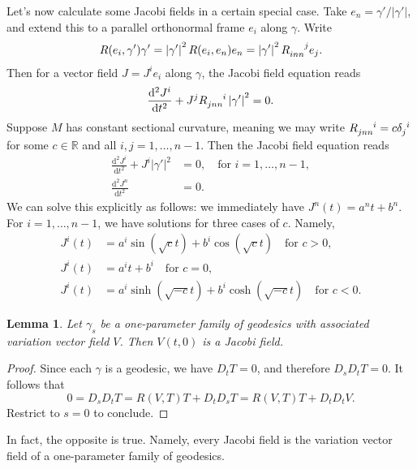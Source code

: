 \documentclass{book}
\newcommand{\bbR}{\mathbb{R}}
\renewcommand{\d}{\mathrm{d}}
\newcommand{\abs}[1]{\left\lvert {#1} \right\rvert}
\newcommand{\odv}[3][]{\frac{\d^{#1}#2}{\d{#3}^{#1}}}
\newtheorem{lemma}[theorem]{Lemma}
\theoremstyle{definition}
\numberwithin{equation}{section}
\begin{document}
Let's now calculate some Jacobi fields in a certain special case. Take $e_n = \gamma' / \abs{\gamma'}$, and extend this to a parallel orthonormal frame $e_i$ along $\gamma$. Write 
\begin{equation} \begin{aligned}
    R(e_i,\gamma') \gamma'
    = \abs{\gamma'}^2 R(e_i, e_n) e_n 
    = \abs{\gamma'}^2 \tensor{R}{_{inn}^j} e_j.
\end{aligned} \end{equation}
Then for a vector field $J = J^i e_i$ along $\gamma$, the Jacobi field equation reads 
\begin{equation}
    \odv[2]{J^i}{t} + J^j \tensor{R}{_{jnn}^i} \abs{\gamma'}^2 = 0.
\end{equation} 
Suppose $M$ has constant sectional curvature, meaning we may write $\tensor{R}{_{jnn}^i} = c \tensor{\delta}{_j^i}$ for some $c \in \bbR$ and all $i,j = 1,\dots,n-1$. Then the Jacobi field equation reads 
\begin{equation} \begin{aligned}
    \odv[2]{J^i}{t} + J^i \abs{\gamma'}^2 &= 0, \quad \text{for } i = 1,\dots,n-1, \\
    \odv[2]{J^n}{t} &= 0.
\end{aligned} \end{equation}
We can solve this explicitly as follows: we immediately have $J^n(t) = a^n t + b^n$. For $i = 1,\dots,n-1$, we have solutions for three cases of $c$. Namely,
\begin{equation} \begin{aligned}
    J^i(t) &= a^i \sin(\sqrt{c}t) + b^i \cos(\sqrt{c}t) \quad \text{for } c > 0, \\
    J^i(t) &= a^i t + b^i \quad \text{for } c = 0, \\
    J^i(t) &= a^i \sinh(\sqrt{-c}t) + b^i \cosh(\sqrt{-c}t) \quad \text{for } c < 0.
\end{aligned} \end{equation}

\begin{lemma}
    Let $\gamma_s$ be a one-parameter family of geodesics with associated variation vector field $V$. Then $V(t,0)$ is a Jacobi field.
\end{lemma}
\begin{proof}
    Since each $\gamma$ is a geodesic, we have $D_t T = 0$, and therefore $D_s D_t T = 0$. It follows that
    \begin{equation}
        0 = D_s D_t T = R(V,T)T + D_t D_s T = R(V,T)T + D_t D_t V.
    \end{equation}
    Restrict to $s = 0$ to conclude.
\end{proof}
In fact, the opposite is true. Namely, every Jacobi field is the variation vector field of a one-parameter family of geodesics.
\end{document}
